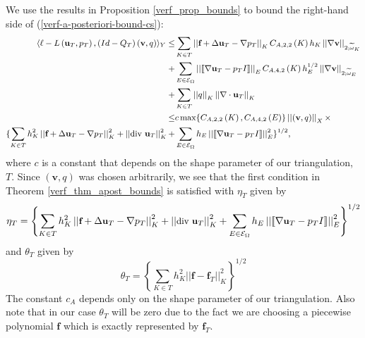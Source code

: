 \documentclass[12pt,a4paper]{article}
\theoremstyle{definition}
\begin{document}
We use the results in Proposition \ref{verf_prop_bounds} to bound the right-hand side of (\ref{verf-a-posteriori-bound-cs}):
\begin{equation}\small
\begin{aligned}\small
\langle \ell -L\left(\textbf{u}_T,p_T\right),\left(Id-Q_T\right)\left(\textbf{v},q\right) \rangle_Y\leq
&\sum_{K\in T}\left|\left|\textbf{f}+\Delta \textbf{u}_T-\nabla p_T \right|\right|_K C_{A,2,2}\left(K\right)h_K \left|\left|\nabla\textbf{v}\right|\right|_{2;\widetilde{\omega}_K}\\
+&\sum_{E\in \mathcal{E}_{\Omega}}\left|\left|\llbracket\nabla \textbf{u}_T-p_TI\rrbracket \right|\right|_EC_{A,4,2}\left(K\right)h_E^{1/2} \left|\left|\nabla\textbf{v}\right|\right|_{2;\widetilde{\omega}_E}\\
+&\sum_{K\in T}\left|\left|q\right|\right|_K\left|\left|\nabla \cdot \textbf{u}_T\right|\right|_K\\
\leq &c\max \{C_{A,2,2}\left(K\right),C_{A,4,2}\left(E\right)\}\left|\left|\left(\textbf{v},q\right)\right|\right|_X\times\\ \{\sum_{K\in T}h^2_K\left|\left|\textbf{f}+\Delta \textbf{u}_T-\nabla p_T \right|\right|_K^2+\left|\left|\text{div } \textbf{u}_T\right|\right|^2_K+&\sum_{E\in \mathcal{E}_{\Omega}}h_E\left|\left|\llbracket\nabla \textbf{u}_T-p_TI\rrbracket \right|\right|_E^2 \}^{1/2},
\end{aligned}
\end{equation}
where $c$ is a constant that depends on the shape parameter of our triangulation, $T$.  Since $\left(\textbf{v},q\right)$ was chosen arbitrarily, we see that the first condition in Theorem \ref{verf_thm_apost_bounds} is satisfied with $\eta_T$ given by  
\begin{equation}\small
\eta_T=\left\lbrace \sum_{K\in T}h^2_K\left|\left|\textbf{f}+\Delta \textbf{u}_T-\nabla p_T \right|\right|_K^2+\left|\left|\text{div }\textbf{u}_T\right|\right|^2_K+\sum_{E\in \mathcal{E}_{\Omega}}h_E\left|\left|\llbracket\nabla \textbf{u}_T-p_TI\rrbracket \right|\right|_E^2  \right\rbrace ^{1/2}
\end{equation}
and $\theta_T$ given by 
\begin{equation}
\theta_T=\left \lbrace \sum_{K\in T}h^2_K\left|\left|\textbf{f}-\textbf{f}_T\right|\right|^2_K \right \rbrace^{1/2}
\end{equation}
The constant $c_A$ depends only on the shape parameter of our triangulation.  Also note that in our case $\theta_T$ will be zero due to the fact we are choosing a piecewise polynomial $\textbf{f}$ which is exactly represented by $\textbf{f}_T$. 
\end{document}
